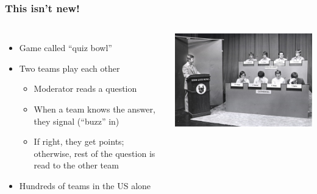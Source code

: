 \documentclass[xcolor=dvipsnames,xcolor=table]{beamer}
\begin{document}
\begin{frame}
	\frametitle{This isn't new!}
	\begin{columns}

	\begin{itemize}
		\item Game called ``quiz bowl''
		\item Two teams play each other
		\begin{itemize}
			\item Moderator reads a question
			\item When a team knows the answer, they signal (``buzz'' in)
			\item If right, they get points; otherwise, rest of the question is read to the other team
		\end{itemize}
		\item Hundreds of teams in the US alone
	\end{itemize}

	\includegraphics{qb/quizbowl}

	\end{columns}

\end{frame}
\end{document}

